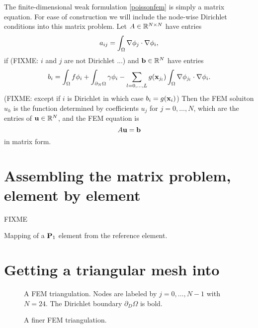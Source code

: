 The finite-dimensional weak formulation \eqref{poissonfem} is simply a matrix equation.  For ease of construction we will include the node-wise Dirichlet conditions into this matrix problem.  Let $A \in \mathbb{R}^{N\times N}$ have entries
\begin{equation*}
a_{ij} = \int_\Omega \nabla \phi_j \cdot \nabla \phi_i,
\end{equation*}
if (FIXME: $i$ and $j$ are not Dirichlet ...)
and $\mathbf{b}\in \mathbb{R}^N$ have entries
\begin{equation*}
b_i = \int_\Omega f \phi_i + \int_{\partial_N\Omega} \gamma \phi_i - \sum_{l=0,\dots,L} g(\mathbf{x}_{j_l})  \int_\Omega \nabla \phi_{j_l} \cdot \nabla \phi_i.
\end{equation*}
(FIXME: except if $i$ is Dirichlet in which case $b_i=g(\mathbf{x}_i)$)
Then the FEM soluiton $u_h$ is the function determined by coefficients $u_j$ for $j=0,\dots,N$, which are the entries of $\mathbf{u} \in \mathbb{R}^N$, and the FEM equation is
\begin{equation}
A \mathbf{u} = \mathbf{b} \label{poissonmatrix}
\end{equation}
in matrix form.



\section{Assembling the matrix problem, element by element}

\begin{marginfigure}
FIXME
\caption{Mapping of a $\mathbf{P}_1$ element from the reference element.}
\label{fig:isoparametric}
\end{marginfigure}



\clearpage

\section{Getting a triangular mesh into \PETSc}

\begin{figure*}

\caption{A FEM triangulation.  Nodes are labeled by $j=0,\dots,N-1$ with $N=24$.  The Dirichlet boundary $\partial_D \Omega$ is bold.}
\label{fig:triangulation}
\end{figure*}

\begin{figure*}

\caption{A finer FEM triangulation.}
\label{fig:finertriangulation}
\end{figure*}

